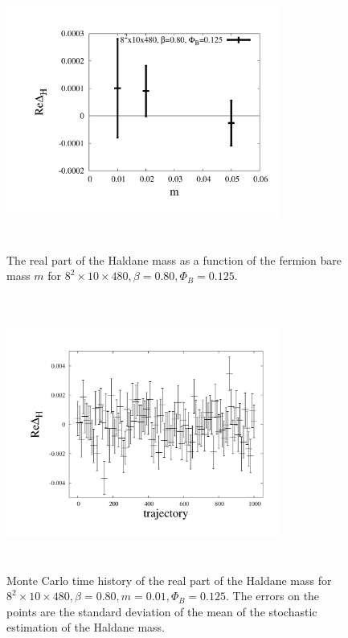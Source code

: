 \documentclass[aps,prd,twocolumn,showpacs,superscriptaddress,groupedaddress]{revtex4}  %
\begin{document}
\begin{figure}
\vspace{-1.2cm}
 \includegraphics[height=9cm,width=9cm]{haldane_real_vs_m_Nt480_PHIB0125.pdf} 
 \vspace{-1.25cm}
\caption{The real part of the Haldane mass as a function of the fermion bare mass $m$ for $8^2\times10\times480,\beta=0.80, \Phi_B=0.125$.}
\label{ReHaldanevsm} 
\end{figure}

\begin{figure}
\vspace{-1.2cm}
 \includegraphics[height=9cm,width=9cm]{haldane_real_810480b80B8m001PvP_TS_graphene_paper.pdf} 
 \vspace{-1.25cm}
\caption{Monte Carlo time history of the real part of the Haldane mass  for $8^2\times10\times480,\beta=0.80, m=0.01, \Phi_B=0.125$. The errors on the points are the standard deviation of the mean of the stochastic estimation of the Haldane mass. }
\label{ReHaldaneTS} 
\end{figure}
\end{document}
